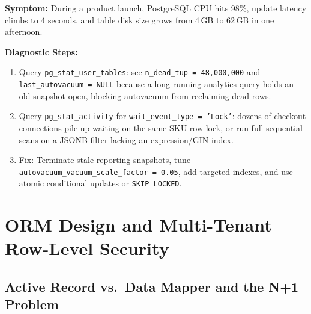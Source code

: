 \begin{realworldbox}
\textbf{Symptom:} During a product launch, PostgreSQL CPU hits 98\%, update latency climbs to 4 seconds, and table disk size grows from 4\,GB to 62\,GB in one afternoon.

\textbf{Diagnostic Steps:}
\begin{enumerate}[leftmargin=15pt,itemsep=2pt]
  \item Query \texttt{pg\_stat\_user\_tables}: see \texttt{n\_dead\_tup = 48{,}000{,}000} and \texttt{last\_autovacuum = NULL} because a long-running analytics query holds an old snapshot open, blocking autovacuum from reclaiming dead rows.
  \item Query \texttt{pg\_stat\_activity} for \texttt{wait\_event\_type = 'Lock'}: dozens of checkout connections pile up waiting on the same SKU row lock, or run full sequential scans on a JSONB filter lacking an expression/GIN index.
  \item Fix: Terminate stale reporting snapshots, tune \texttt{autovacuum\_vacuum\_scale\_factor = 0.05}, add targeted indexes, and use atomic conditional updates or \texttt{SKIP LOCKED}.
\end{enumerate}
\end{realworldbox}

\section{ORM Design and Multi-Tenant Row-Level Security}

\subsection{Active Record vs.\ Data Mapper and the N+1 Problem}

